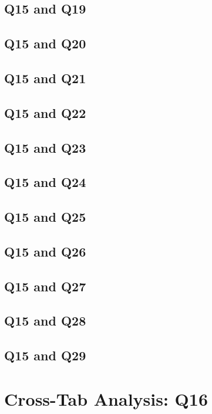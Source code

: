 \documentclass{report}
\begin{document}
\section{Q15 and Q19}\clearpage
\section{Q15 and Q20}\clearpage
\section{Q15 and Q21}\clearpage
\section{Q15 and Q22}\clearpage
\section{Q15 and Q23}\clearpage
\section{Q15 and Q24}\clearpage
\section{Q15 and Q25}\clearpage
\section{Q15 and Q26}\clearpage
\section{Q15 and Q27}\clearpage
\section{Q15 and Q28}\clearpage
\section{Q15 and Q29}\clearpage

\chapter{Cross-Tab Analysis: Q16}
\end{document}
